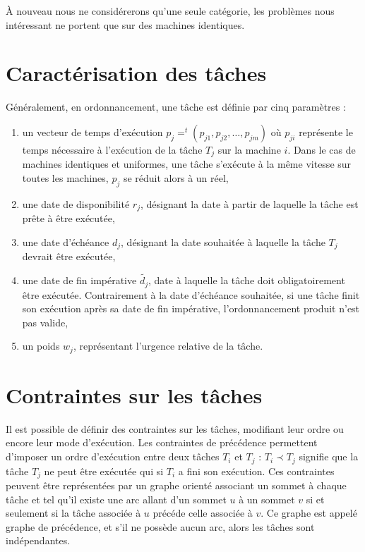 \documentclass[a4paper,11pt]{report}
\begin{document}
À nouveau nous ne considérerons qu'une seule catégorie, les problèmes nous intéressant ne portent
que sur des machines identiques.

\section{Caractérisation des tâches}

Généralement, en ordonnancement, une tâche est définie par cinq paramètres :
\begin{enumerate}
    \item un vecteur de temps d'exécution $p_j = ^t(p_{j1}, p_{j2}, \dots, p_{jm})$ où $p_{ji}$
        représente le temps nécessaire à l'exécution de la tâche $T_j$ sur la machine $i$. Dans le cas
        de machines identiques et uniformes, une tâche s'exécute à la même vitesse sur toutes les
        machines, $p_j$ se réduit alors à un réel,
    \item une date de disponibilité $r_j$, désignant la date à partir de laquelle la tâche est prête
        à être exécutée,
    \item une date d'échéance $d_j$, désignant la date souhaitée à laquelle la tâche $T_j$ devrait
        être exécutée,
    \item une date de fin impérative $\widetilde{d_j}$, date à laquelle la tâche doit
        obligatoirement être exécutée. Contrairement à la date d'échéance souhaitée, si une tâche
        finit son exécution après sa date de fin impérative, l'ordonnancement produit n'est pas
        valide,
    \item un poids $w_j$, représentant l'urgence relative de la tâche.
\end{enumerate}


\section{Contraintes sur les tâches}

Il est possible de définir des contraintes sur les tâches, modifiant leur ordre ou encore  leur
mode d'exécution. Les contraintes de précédence permettent d'imposer un ordre d'exécution entre deux
tâches $T_i$ et $T_j$ : $T_i \prec T_j$ signifie que la tâche $T_j$ ne peut être exécutée qui si
$T_i$ a fini son exécution. Ces contraintes peuvent être représentées par un graphe orienté associant un
sommet à chaque tâche et tel qu'il existe une arc allant d'un sommet $u$ à un sommet $v$ si et
seulement si la tâche associée à $u$ précéde celle associée à $v$. Ce graphe est appelé graphe de
précédence, et s'il ne possède aucun arc, alors les tâches sont indépendantes.
\end{document}
